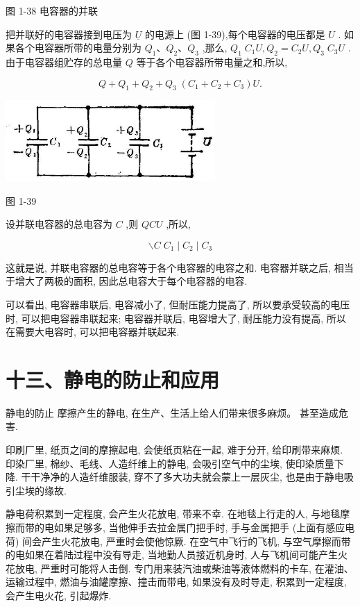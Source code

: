 \documentclass[10pt]{article}
\begin{document}
图 1-38 电容器的并联

把并联好的电容器接到电压为 \(\underline{U}\) 的电源上 (图 1-39),每个电容器的电压都是 \(U\) . 如果各个电容器所带的电量分别为 \({Q}_{1}\text{、}{Q}_{2}\text{、}{Q}_{3}\) ,那么, \({Q}_{1}\;{C}_{1}U,{Q}_{2} = {C}_{2}U,{Q}_{3}\;{C}_{3}U\) . 由于电容器组贮存的总电量 \(Q\) 等于各个电容器所带电量之和,所以,

\[
Q + {Q}_{1} + {Q}_{2} + {Q}_{3}\;\left( {{C}_{1} + {C}_{2} + {C}_{3}}\right) U.
\]

\begin{center}
\includegraphics[max width=0.6\textwidth]{images/01913056-1f15-74d8-9184-9aab52c9d66b_50_240382.jpg}
\end{center}

图 1-39

设并联电容器的总电容为 \(C\) ,则 \({QCU}\) ,所以,

\[
\smallsetminus C\;{C}_{1} \mid {C}_{2} \mid {C}_{3}
\]

这就是说, 并联电容器的总电容等于各个电容器的电容之和. 电容器并联之后, 相当于增大了两极的面积, 因此总电容大于每个电容器的电容.

可以看出, 电容器串联后, 电容减小了, 但耐压能力提高了, 所以要承受较高的电压时, 可以把电容器串联起来; 电容器并联后, 电容增大了, 耐压能力没有提高, 所以在需要大电容时, 可以把电容器并联起来.

\section*{十三、静电的防止和应用}

静电的防止 摩擦产生的静电, 在生产、生活上给人们带来很多麻烦。 甚至造成危害.

印刷厂里, 纸页之间的摩擦起电, 会使纸页粘在一起, 难于分开, 给印刷带来麻烦. 印染厂里, 棉纱、毛线、人造纤维上的静电, 会吸引空气中的尘埃, 使印染质量下降. 干干净净的人造纤维服装, 穿不了多大功夫就会蒙上一层灰尘, 也是由于静电吸引尘埃的缘故.

静电荷积累到一定程度, 会产生火花放电, 带来不幸. 在地毯上行走的人, 与地毯摩擦而带的电如果足够多, 当他伸手去拉金属门把手时, 手与金属把手 (上面有感应电荷) 间会产生火花放电, 严重时会使他惊厥. 在空气中飞行的飞机, 与空气摩擦而带的电如果在着陆过程中没有导走, 当地勤人员接近机身时, 人与飞机间可能产生火花放电, 严重时可能将人击倒. 专门用来装汽油或柴油等液体燃料的卡车, 在灌油、运输过程中, 燃油与油罐摩擦、撞击而带电, 如果没有及时导走, 积累到一定程度, 会产生电火花, 引起爆炸.
\end{document}
